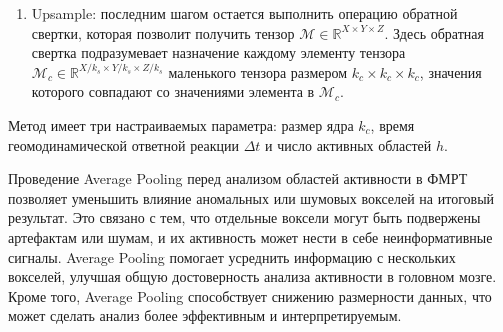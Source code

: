 \documentclass[a4paper, 12pt]{extarticle}
\begin{document}
\begin{enumerate}
	\item Upsample: последним шагом остается выполнить операцию обратной свертки, которая позволит получить тензор $\mathcal{M} \in \mathbb{R}^{X \times Y \times Z}$. Здесь обратная свертка подразумевает назначение каждому элементу тензора $\mathcal{M}_c \in \mathbb{R}^{X/ k_s \times Y/ k_s \times Z/ k_s}$ маленького тензора размером $k_c \times k_c \times k_c$, значения которого совпадают со значениями элемента в $\mathcal{M}_c$.
	
\end{enumerate}
Метод имеет три настраиваемых параметра: размер ядра $k_c$, время геомодинамической ответной реакции 
$\Delta t$ и число активных областей $h$.

Проведение Average Pooling перед анализом областей активности в ФМРТ позволяет уменьшить влияние аномальных или шумовых вокселей на итоговый результат. 
Это связано с тем, что отдельные воксели могут быть подвержены артефактам или шумам, и их активность может нести в себе неинформативные сигналы. 
Average Pooling помогает усреднить информацию с нескольких вокселей, улучшая общую достоверность анализа активности в головном мозге. 
Кроме того, Average Pooling способствует снижению размерности данных, что может сделать анализ более эффективным и интерпретируемым.
\end{document}
